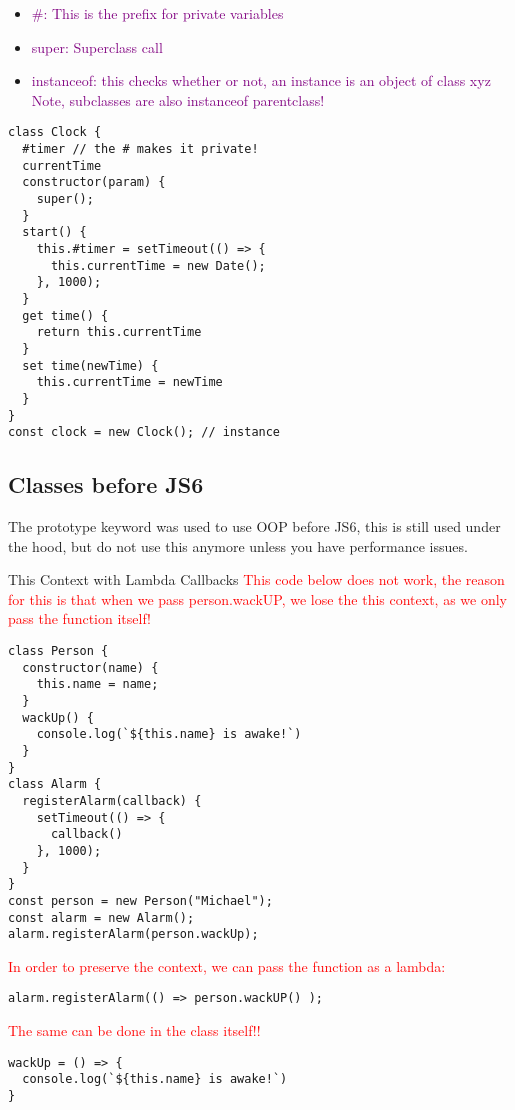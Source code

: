 \documentclass[main.tex,fontsize=6pt,paper=a4,paper=landscape,DIV=calc,]{scrartcl}
\begin{document}
\begin{multicols*}{4}
\begin{itemize}
\item \textcolor{purple}{\#: This is the prefix for private variables}
\item \textcolor{purple}{super: Superclass call}
\item \textcolor{purple}{instanceof: this checks whether or not,\newline
  an instance is an object of class xyz\newline
Note, subclasses are also instanceof parentclass!}
\end{itemize}
\vspace{-2mm}
\begin{lstlisting}
class Clock {
  #timer // the # makes it private!
  currentTime
  constructor(param) {
    super();
  }
  start() {
    this.#timer = setTimeout(() => { 
      this.currentTime = new Date();
    }, 1000);
  }
  get time() {
    return this.currentTime
  }
  set time(newTime) {
    this.currentTime = newTime
  }
}
const clock = new Clock(); // instance
\end{lstlisting}
\vspace{2mm}

\subsection{Classes before JS6}  
The prototype keyword was used to use OOP before JS6, this is still used under the hood, but do not use this anymore unless you have performance issues.

This Context with Lambda Callbacks 
\textcolor{red}{This code below does not work, the reason for this is that when we pass person.wackUP, we lose the this context, as we only pass the function itself!}\newline
\vspace{-2mm}
\begin{lstlisting}
class Person {
  constructor(name) {
    this.name = name;
  }
  wackUp() {
    console.log(`${this.name} is awake!`)
  }
}
class Alarm {
  registerAlarm(callback) {
    setTimeout(() => {
      callback()
    }, 1000);
  }
}
const person = new Person("Michael");
const alarm = new Alarm();
alarm.registerAlarm(person.wackUp);
\end{lstlisting}
\vspace{2mm}
\textcolor{red}{In order to preserve the context, we can pass the function as a lambda:}\newline
\vspace{-2mm}
\begin{lstlisting}
alarm.registerAlarm(() => person.wackUP() );
\end{lstlisting}
\vspace{2mm} 
\textcolor{red}{The same can be done in the class itself!!}\newline
\vspace{-2mm}
\begin{lstlisting}
wackUp = () => {
  console.log(`${this.name} is awake!`)
}
\end{lstlisting}
\vspace{2mm}


\end{multicols*}
\end{document}
